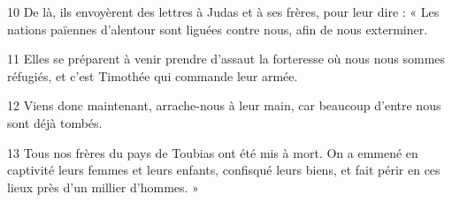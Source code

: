 
10 De là, ils envoyèrent des lettres à Judas et à ses frères, pour leur dire : « Les nations païennes d’alentour sont liguées contre nous, afin de nous exterminer.

11 Elles se préparent à venir prendre d’assaut la forteresse où nous nous sommes réfugiés, et c’est Timothée qui commande leur armée.

12 Viens donc maintenant, arrache-nous à leur main, car beaucoup d’entre nous sont déjà tombés.

13 Tous nos frères du pays de Toubias ont été mis à mort. On a emmené en captivité leurs femmes et leurs enfants, confisqué leurs biens, et fait périr en ces lieux près d’un millier d’hommes. »